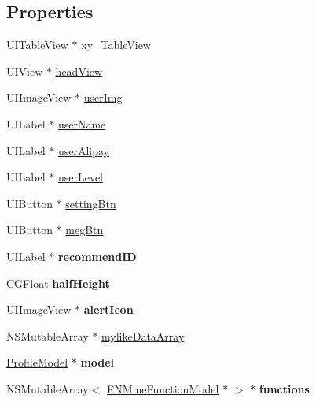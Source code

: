 \subsection*{Properties}
\begin{DoxyCompactItemize}
\item 
U\+I\+Table\+View $\ast$ \mbox{\hyperlink{category_mine_view_controller_07_08_a1f2daffa5dc1b259c2ba7167a4de14c5}{xy\+\_\+\+Table\+View}}
\item 
U\+I\+View $\ast$ \mbox{\hyperlink{category_mine_view_controller_07_08_a3a5a29dfc318bb8f74a706447a500e32}{head\+View}}
\item 
U\+I\+Image\+View $\ast$ \mbox{\hyperlink{category_mine_view_controller_07_08_a0509ccefafa426acd7acc107ef6a8de3}{user\+Img}}
\item 
U\+I\+Label $\ast$ \mbox{\hyperlink{category_mine_view_controller_07_08_ae9a2aa12019845e498be05247cd2a0dd}{user\+Name}}
\item 
U\+I\+Label $\ast$ \mbox{\hyperlink{category_mine_view_controller_07_08_ac7cfce2bdeecc9e4c2255f184b5fd6e8}{user\+Alipay}}
\item 
U\+I\+Label $\ast$ \mbox{\hyperlink{category_mine_view_controller_07_08_ae46b3ca7a1b87cac84cdd3c30fc1a1d1}{user\+Level}}
\item 
U\+I\+Button $\ast$ \mbox{\hyperlink{category_mine_view_controller_07_08_a786f444185586ed6a70f5edd14fe378c}{setting\+Btn}}
\item 
U\+I\+Button $\ast$ \mbox{\hyperlink{category_mine_view_controller_07_08_ac5a09a82c63cd6649b63ceee948c2209}{meg\+Btn}}
\item 
\mbox{\label{category_mine_view_controller_07_08_a5e2b10b2517f6fd872da3c9c72a07e1a}} 
U\+I\+Label $\ast$ {\bfseries recommend\+ID}
\item 
\mbox{\label{category_mine_view_controller_07_08_a9671bf42fd2df859fb8af49b1c1e9a2f}} 
C\+G\+Float {\bfseries half\+Height}
\item 
\mbox{\label{category_mine_view_controller_07_08_a7de939d028566f8c8ade6e9e11142eb0}} 
U\+I\+Image\+View $\ast$ {\bfseries alert\+Icon}
\item 
N\+S\+Mutable\+Array $\ast$ \mbox{\hyperlink{category_mine_view_controller_07_08_a3d180f0c55c4d6af31f72fb302558952}{mylike\+Data\+Array}}
\item 
\mbox{\label{category_mine_view_controller_07_08_a41d263e4edd5a00eedce212034442363}} 
\mbox{\hyperlink{interface_profile_model}{Profile\+Model}} $\ast$ {\bfseries model}
\item 
\mbox{\label{category_mine_view_controller_07_08_a7368d0c3dd288d4fdd068433dc5245aa}} 
N\+S\+Mutable\+Array$<$ \mbox{\hyperlink{interface_f_n_mine_function_model}{F\+N\+Mine\+Function\+Model}} $\ast$ $>$ $\ast$ {\bfseries functions}
\end{DoxyCompactItemize}


